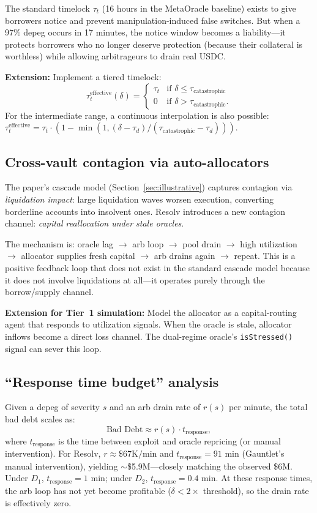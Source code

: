 \documentclass[11pt]{article}
\begin{document}
The standard timelock $\tau_t$ (16 hours in the MetaOracle baseline) exists to give borrowers notice and prevent manipulation-induced false switches. But when a 97\% depeg occurs in 17 minutes, the notice window becomes a liability---it protects borrowers who no longer deserve protection (because their collateral is worthless) while allowing arbitrageurs to drain real USDC.

\textbf{Extension:} Implement a tiered timelock:
\[
\tau_t^{\text{effective}}(\delta) = \begin{cases}
\tau_t & \text{if } \delta \le \tau_{\mathrm{catastrophic}} \\
0 & \text{if } \delta > \tau_{\mathrm{catastrophic}}.
\end{cases}
\]
For the intermediate range, a continuous interpolation is also possible: $\tau_t^{\text{effective}} = \tau_t \cdot (1 - \min(1, (\delta - \tau_d) / (\tau_{\mathrm{catastrophic}} - \tau_d)))$.

\subsection{Cross-vault contagion via auto-allocators}

The paper's cascade model (Section~\ref{sec:illustrative}) captures contagion via \emph{liquidation impact}: large liquidation waves worsen execution, converting borderline accounts into insolvent ones. Resolv introduces a new contagion channel: \emph{capital reallocation under stale oracles}.

The mechanism is: oracle lag $\to$ arb loop $\to$ pool drain $\to$ high utilization $\to$ allocator supplies fresh capital $\to$ arb drains again $\to$ repeat. This is a positive feedback loop that does not exist in the standard cascade model because it does not involve liquidations at all---it operates purely through the borrow/supply channel.

\textbf{Extension for Tier~1 simulation:} Model the allocator as a capital-routing agent that responds to utilization signals. When the oracle is stale, allocator inflows become a direct loss channel. The dual-regime oracle's \texttt{isStressed()} signal can sever this loop.

\subsection{``Response time budget'' analysis}

Given a depeg of severity $s$ and an arb drain rate of $r(s)$ per minute, the total bad debt scales as:
\[
\text{Bad Debt} \approx r(s) \cdot t_{\text{response}},
\]
where $t_{\text{response}}$ is the time between exploit and oracle repricing (or manual intervention). For Resolv, $r \approx \$67\text{K/min}$ and $t_{\text{response}} = 91$ min (Gauntlet's manual intervention), yielding $\sim$\$5.9M---closely matching the observed \$6M. Under $D_1$, $t_{\text{response}} = 1$ min; under $D_2$, $t_{\text{response}} = 0.4$ min. At these response times, the arb loop has not yet become profitable ($\delta < 2\times$ threshold), so the drain rate is effectively zero.
\end{document}
